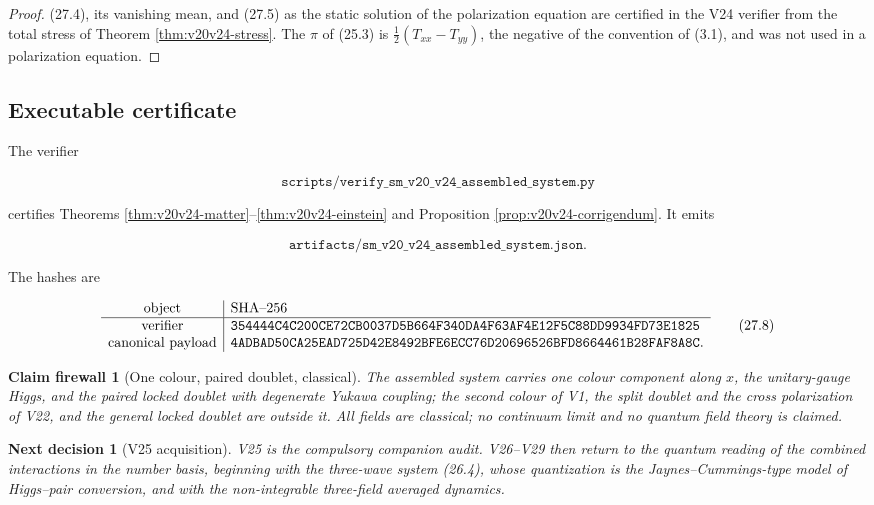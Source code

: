 \documentclass[11pt]{article}
\newtheorem{firewall}[theorem]{Claim firewall}
\newtheorem{decision}[theorem]{Next decision}
\theoremstyle{remark}
\begin{document}
\begin{proof}
(27.4), its vanishing mean, and (27.5) as the static solution of the
polarization equation are certified in the V24 verifier from the
total stress of Theorem \ref{thm:v20v24-stress}.  The \(\pi\) of
(25.3) is \(\tfrac12(T_{xx}-T_{yy})\), the negative of the convention
of (3.1), and was not used in a polarization equation.
\end{proof}

\subsection{Executable certificate}

The verifier

\[
 \texttt{scripts/verify\_sm\_v20\_v24\_assembled\_system.py}          \tag{27.6}
\]

certifies Theorems \ref{thm:v20v24-matter}--\ref{thm:v20v24-einstein}
and Proposition \ref{prop:v20v24-corrigendum}.  It emits

\[
 \texttt{artifacts/sm\_v20\_v24\_assembled\_system.json}.             \tag{27.7}
\]

The hashes are

\[
\begin{array}{c|l}
\hbox{object}&\hbox{SHA--256}\\ \hline
\hbox{verifier}&
\texttt{354444C4C200CE72CB0037D5B664F340DA4F63AF4E12F5C88DD9934FD73E1825}\\
\hbox{canonical payload}&
\texttt{4ADBAD50CA25EAD725D42E8492BFE6ECC76D20696526BFD8664461B28FAF8A8C}.
\end{array}                                                     \tag{27.8}
\]

\begin{firewall}[One colour, paired doublet, classical]
\label{fire:v20v24}
The assembled system carries one colour component along \(x\), the
unitary-gauge Higgs, and the paired locked doublet with degenerate
Yukawa coupling; the second colour of V1, the split doublet and the
cross polarization of V22, and the general locked doublet are outside
it.  All fields are classical; no continuum limit and no quantum
field theory is claimed.
\end{firewall}

\begin{decision}[V25 acquisition]
\label{dec:v20v24-next}
V25 is the compulsory companion audit.  V26--V29 then return to the
quantum reading of the combined interactions in the number basis,
beginning with the three-wave system (26.4), whose quantization is
the Jaynes--Cummings-type model of Higgs--pair conversion, and with
the non-integrable three-field averaged dynamics.
\end{decision}
\end{document}
